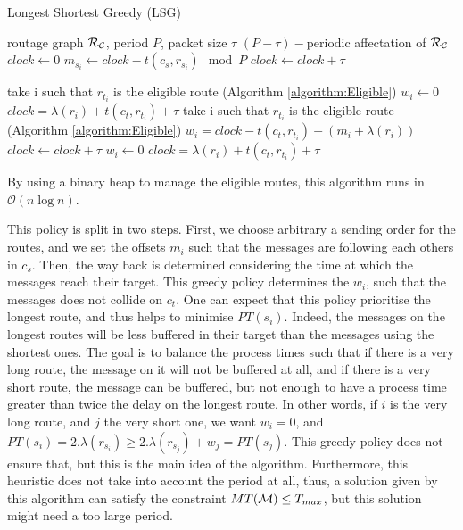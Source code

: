 \documentclass[a4paper,10pt]{article}
\begin{document}
     
    \begin{algorithm}[H]
    \caption{Longest Shortest Greedy (LSG)}
    \begin{algorithmic}
    \REQUIRE routage graph ${\cal R_{\cal C}}$, period $P$, packet size $\tau$
    \ENSURE $(P-\tau)-$periodic affectation of ${\cal R_{\cal C}}$
    \STATE $clock \leftarrow 0$
    \STATE  $m_{s_i} \leftarrow clock - t(c_s,r_{s_i}) \mod P$
    \STATE $clock \leftarrow clock + \tau$
    \ENDFOR

    \STATE take i such that $r_{t_i}$ is the eligible route (Algorithm \ref{algorithm:Eligible})
    \STATE $w_i \leftarrow 0$
    \STATE $clock = \lambda(r_i) + t(c_t,r_{t_i}) + \tau$
    \STATE take i such that $r_{t_i}$ is the eligible route (Algorithm \ref{algorithm:Eligible})
    \STATE $w_i = clock - t(c_t,r_{t_i}) - (m_i + \lambda(r_i))$ 
    \STATE $clock \leftarrow clock + \tau$
    \ELSE
    \STATE $w_i \leftarrow 0$
    \STATE $clock = \lambda(r_i) + t(c_t,r_{t_i}) + \tau$
   \ENDIF

    \ENDWHILE

    \end{algorithmic}
    \end{algorithm}
    
    By using a binary heap to manage the eligible routes, this algorithm runs in $\mathcal{O}(n\log{}n)$.
    
    This policy is split in two steps. First, we choose arbitrary a sending order for the routes, and we set the offsets $m_i$ such that the messages are following each others in $c_s$. Then, the way back is determined considering the time at which the messages reach their target. This greedy policy determines the $w_i$, such that the messages does not collide on $c_t$. One can expect that this policy prioritise the longest route, and thus helps to minimise $PT(s_i)$. Indeed, the messages on the longest routes will be less buffered in their target than the messages using the shortest ones. The goal is to balance the process times such that if there is a very long route, the message on it will not be buffered at all, and if there is a very short route, the message can be buffered, but not enough to have a process time greater than twice the delay on the longest route. In other words, if $i$ is the very long route, and $j$ the very short one, we want $w_i =0$, and $PT(s_i) = 2.\lambda(r_{s_i}) \geq  2.\lambda(r_{s_j}) + w_j = PT(s_j) $.
    This greedy policy does not ensure that, but this is the main idea of the algorithm.
    Furthermore, this heuristic does not take into account the period at all, thus, a solution given by this algorithm can satisfy the constraint $MT({\cal M}) \leq T_{max}$, but this solution might need a too large period.
\end{document}
